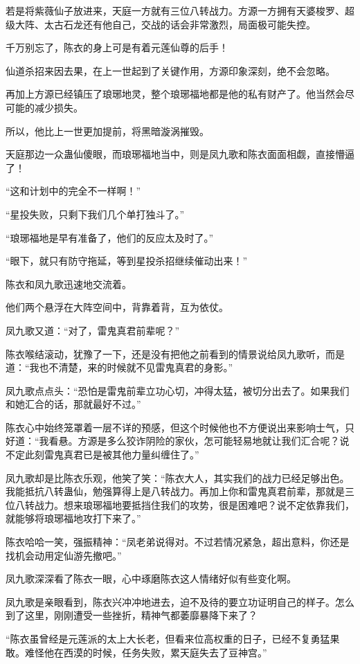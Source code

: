 \begin{this_body}
若是将紫薇仙子放进来，天庭一方就有三位八转战力。方源一方拥有天婆梭罗、超级大阵、太古石龙还有他自己，交战的话会非常激烈，局面极可能失控。

千万别忘了，陈衣的身上可是有着元莲仙尊的后手！

仙道杀招来因去果，在上一世起到了关键作用，方源印象深刻，绝不会忽略。

再加上方源已经镇压了琅琊地灵，整个琅琊福地都是他的私有财产了。他当然会尽可能的减少损失。

所以，他比上一世更加提前，将黑暗漩涡摧毁。

天庭那边一众蛊仙傻眼，而琅琊福地当中，则是凤九歌和陈衣面面相觑，直接懵逼了！

“这和计划中的完全不一样啊！”

“星投失败，只剩下我们几个单打独斗了。”

“琅琊福地是早有准备了，他们的反应太及时了。”

“眼下，就只有防守拖延，等到星投杀招继续催动出来！”

陈衣和凤九歌迅速地交流着。

他们两个悬浮在大阵空间中，背靠着背，互为依仗。

凤九歌又道：“对了，雷鬼真君前辈呢？”

陈衣喉结滚动，犹豫了一下，还是没有把他之前看到的情景说给凤九歌听，而是道：“我也不清楚，来的时候就不见雷鬼真君的身影。”

凤九歌点点头：“恐怕是雷鬼前辈立功心切，冲得太猛，被切分出去了。如果我们和她汇合的话，那就最好不过。”

陈衣心中始终笼罩着一层不详的预感，但这个时候他也不方便说出来影响士气，只好道：“我看悬。方源是多么狡诈阴险的家伙，怎可能轻易地就让我们汇合呢？说不定此刻雷鬼真君已是被其他力量纠缠住了。”

凤九歌却是比陈衣乐观，他笑了笑：“陈衣大人，其实我们的战力已经足够出色。我能抵抗八转蛊仙，勉强算得上是八转战力。再加上你和雷鬼真君前辈，那就是三位八转战力。想来琅琊福地要抵挡住我们的攻势，很是困难吧？说不定依靠我们，就能够将琅琊福地攻打下来了。”

陈衣哈哈一笑，强振精神：“凤老弟说得对。不过若情况紧急，超出意料，你还是找机会动用定仙游先撤吧。”

凤九歌深深看了陈衣一眼，心中琢磨陈衣这人情绪好似有些变化啊。

凤九歌是亲眼看到，陈衣兴冲冲地进去，迫不及待的要立功证明自己的样子。怎么到了这里，刚刚遭受一些挫折，精神气都萎靡暴降下来了？

“陈衣虽曾经是元莲派的太上大长老，但看来位高权重的日子，已经不复勇猛果敢。难怪他在西漠的时候，任务失败，累天庭失去了豆神宫。”


\end{this_body}
